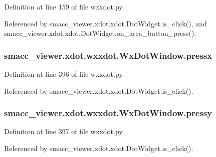 Definition at line 159 of file wxxdot.\+py.



Referenced by smacc\+\_\+viewer.\+xdot.\+xdot.\+Dot\+Widget.\+is\+\_\+click(), and smacc\+\_\+viewer.\+xdot.\+xdot.\+Dot\+Widget.\+on\+\_\+area\+\_\+button\+\_\+press().

\subsubsection[{\texorpdfstring{pressx}{pressx}}]{\setlength{\rightskip}{0pt plus 5cm}smacc\+\_\+viewer.\+xdot.\+wxxdot.\+Wx\+Dot\+Window.\+pressx}\hypertarget{classsmacc__viewer_1_1xdot_1_1wxxdot_1_1WxDotWindow_a2976e51e248296a84e56f8aac1f38478}{}\label{classsmacc__viewer_1_1xdot_1_1wxxdot_1_1WxDotWindow_a2976e51e248296a84e56f8aac1f38478}


Definition at line 396 of file wxxdot.\+py.



Referenced by smacc\+\_\+viewer.\+xdot.\+xdot.\+Dot\+Widget.\+is\+\_\+click().

\subsubsection[{\texorpdfstring{pressy}{pressy}}]{\setlength{\rightskip}{0pt plus 5cm}smacc\+\_\+viewer.\+xdot.\+wxxdot.\+Wx\+Dot\+Window.\+pressy}\hypertarget{classsmacc__viewer_1_1xdot_1_1wxxdot_1_1WxDotWindow_ad89ed9b6cee063586d45ca27a1c4b016}{}\label{classsmacc__viewer_1_1xdot_1_1wxxdot_1_1WxDotWindow_ad89ed9b6cee063586d45ca27a1c4b016}


Definition at line 397 of file wxxdot.\+py.



Referenced by smacc\+\_\+viewer.\+xdot.\+xdot.\+Dot\+Widget.\+is\+\_\+click().

